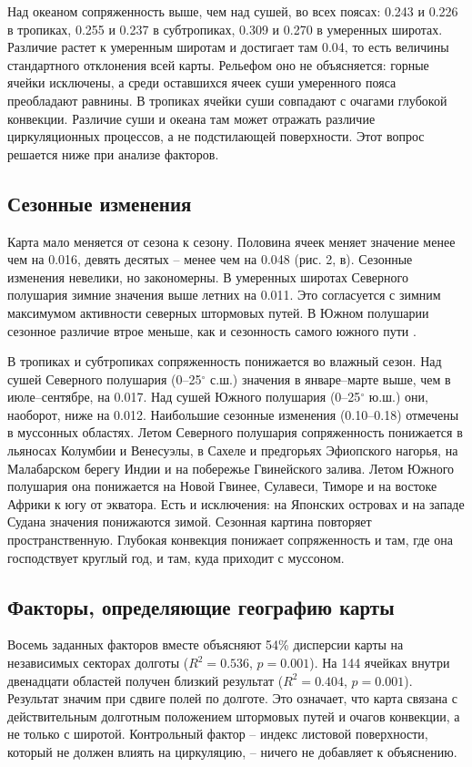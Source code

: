 \documentclass[12pt,a4paper]{article}
\begin{document}
Над океаном сопряженность выше, чем над сушей, во всех поясах: 0.243 и 0.226 в тропиках, 0.255 и 0.237 в субтропиках, 0.309 и 0.270 в умеренных широтах. Различие растет к умеренным широтам и достигает там 0.04, то есть величины стандартного отклонения всей карты. Рельефом оно не объясняется: горные ячейки исключены, а среди оставшихся ячеек суши умеренного пояса преобладают равнины. В тропиках ячейки суши совпадают с очагами глубокой конвекции. Различие суши и океана там может отражать различие циркуляционных процессов, а не подстилающей поверхности. Этот вопрос решается ниже при анализе факторов.

\subsection{Сезонные изменения}

Карта мало меняется от сезона к сезону. Половина ячеек меняет значение менее чем на 0.016, девять десятых -- менее чем на 0.048 (рис. 2, в). Сезонные изменения невелики, но закономерны. В умеренных широтах Северного полушария зимние значения выше летних на 0.011. Это согласуется с зимним максимумом активности северных штормовых путей. В Южном полушарии сезонное различие втрое меньше, как и сезонность самого южного пути \cite{Trenberth1991}.

В тропиках и субтропиках сопряженность понижается во влажный сезон. Над сушей Северного полушария (0--25$^\circ$ с.ш.) значения в январе--марте выше, чем в июле--сентябре, на 0.017. Над сушей Южного полушария (0--25$^\circ$ ю.ш.) они, наоборот, ниже на 0.012. Наибольшие сезонные изменения (0.10--0.18) отмечены в муссонных областях. Летом Северного полушария сопряженность понижается в льяносах Колумбии и Венесуэлы, в Сахеле и предгорьях Эфиопского нагорья, на Малабарском берегу Индии и на побережье Гвинейского залива. Летом Южного полушария она понижается на Новой Гвинее, Сулавеси, Тиморе и на востоке Африки к югу от экватора. Есть и исключения: на Японских островах и на западе Судана значения понижаются зимой. Сезонная картина повторяет пространственную. Глубокая конвекция понижает сопряженность и там, где она господствует круглый год, и там, куда приходит с муссоном.

\subsection{Факторы, определяющие географию карты}

Восемь заданных факторов вместе объясняют 54\% дисперсии карты на независимых секторах долготы ($R^2 = 0.536$, $p = 0.001$). На 144 ячейках внутри двенадцати областей получен близкий результат ($R^2 = 0.404$, $p = 0.001$). Результат значим при сдвиге полей по долготе. Это означает, что карта связана с действительным долготным положением штормовых путей и очагов конвекции, а не только с широтой. Контрольный фактор -- индекс листовой поверхности, который не должен влиять на циркуляцию, -- ничего не добавляет к объяснению.
\end{document}
